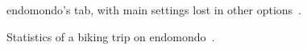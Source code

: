 \begin{figure}[htb!]
    \centering
        \caption{endomondo's  tab, with main settings lost in other options~\cite{endomondo-more-tab}.}
        \label{endomondo-more-tab}
\end{figure}

\begin{figure}[htb!]
    \centering
        \caption{Statistics of a biking trip on endomondo~\cite{endomondo-bike-stats-img}.}
\end{figure}

